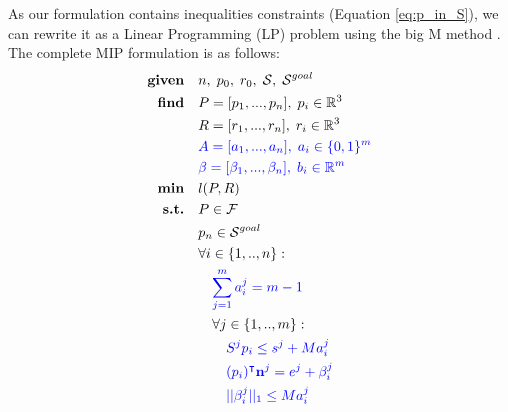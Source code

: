 As our formulation contains inequalities constraints (Equation \ref{eq:p_in_S}), we can rewrite it as a Linear Programming (LP) problem using the big M method \cite{big_M}. The complete MIP formulation is as follows:
\begin{align}
    \textrm{\textbf{given}} %
                            \quad & n, \; p_0, \; r_0, \; \mathcal{S}, \; \mathcal{S}^{goal} \nonumber\\
    \textrm{\textbf{find}}  \quad & P=[p_1,...,p_n], \; p_i \in \mathbb{R}^{3} \nonumber\\
                            \quad & R=[r_1,...,r_n], \; r_i \in \mathbb{R}^{3} \nonumber\\
                            \quad & \textcolor{blue}{A=[a_1,...,a_n], \; a_i \in \{0,1\}^{m}} \label{eq:cbm:mip_complete:slacks}\\
                            \quad & \textcolor{blue}{\beta=[\beta_1,...,\beta_n], \; b_i \in \mathbb{R}^{m}} \nonumber\\
    \textrm{\textbf{min}}  \quad & l(P,R) \nonumber\\
    \textrm{\textbf{s.t.}}  \quad & P \in \mathcal{F} \nonumber\\
                            \quad & p_n \in \mathcal{S}^{goal} \nonumber\\
                            \quad & \forall i \in \{1,..,n\} : \nonumber\\
                                \quad & \quad \textcolor{blue}{\sum_{j=1}^{m} a_i^j = m-1} \label{eq:cbm:mip_complete:card}\\
                                \quad & \quad \forall j \in \{1,..,m\} : \nonumber\\
                                    \quad & \quad \quad \textcolor{blue}{S^j p_i \leq s^j + M a_i^j } \label{eq:cbm:mip_complete:surf}\\
                                    \quad & \quad \quad \textcolor{blue}{(p_i)^{\intercal} \textbf{n}^j = e^j + \beta_i^j} \nonumber\\
                                    \quad & \quad \quad \textcolor{blue}{||\beta_i^j||_1 \leq M a_i^j} \nonumber\\
                                    \nonumber
\end{align}
